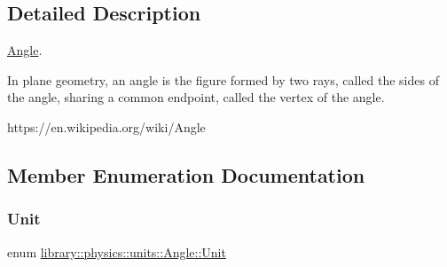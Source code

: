 \subsection{Detailed Description}
\hyperlink{classlibrary_1_1physics_1_1units_1_1_angle}{Angle}. 

In plane geometry, an angle is the figure formed by two rays, called the sides of the angle, sharing a common endpoint, called the vertex of the angle.

https\+://en.wikipedia.\+org/wiki/\+Angle 

\subsection{Member Enumeration Documentation}
\mbox{\label{classlibrary_1_1physics_1_1units_1_1_angle_a3c329d415a61783b16ce481874cc5956}} 
\subsubsection{\texorpdfstring{Unit}{Unit}}
{\footnotesize\ttfamily enum \hyperlink{classlibrary_1_1physics_1_1units_1_1_angle_a3c329d415a61783b16ce481874cc5956}{library\+::physics\+::units\+::\+Angle\+::\+Unit}\hspace{0.3cm}{\ttfamily [strong]}}

